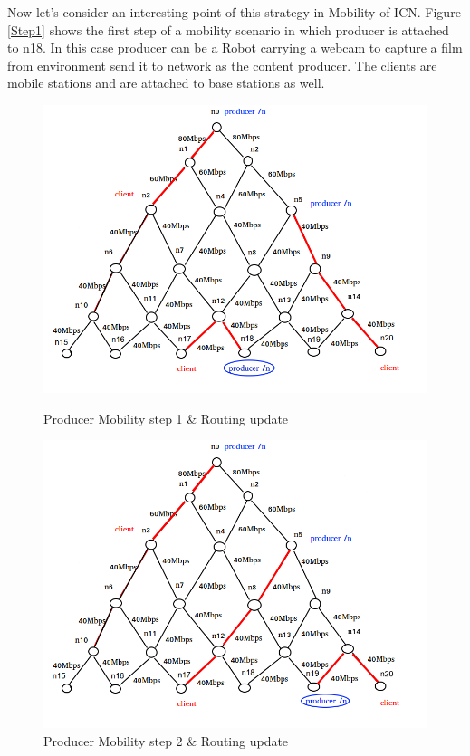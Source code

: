 Now let's consider an interesting point of this strategy in Mobility of ICN. Figure \ref{Step1} shows the first step of a mobility scenario in which producer is attached to n18. In this case producer can be a Robot carrying a webcam to capture a film from environment send it to network as the content producer. The clients are mobile stations and are attached to base stations as well.   


\begin{figure}[H]

\begin{center}


\includegraphics[scale = 0.4]{Figures/Step1.png}

\caption{Producer Mobility step 1 \& Routing update} \label{Step1} 


\includegraphics[scale = 0.4]{Figures/Step2.png}

\caption{Producer Mobility step 2 \& Routing update} \label{Step2} 

\end{center}

\end{figure}







